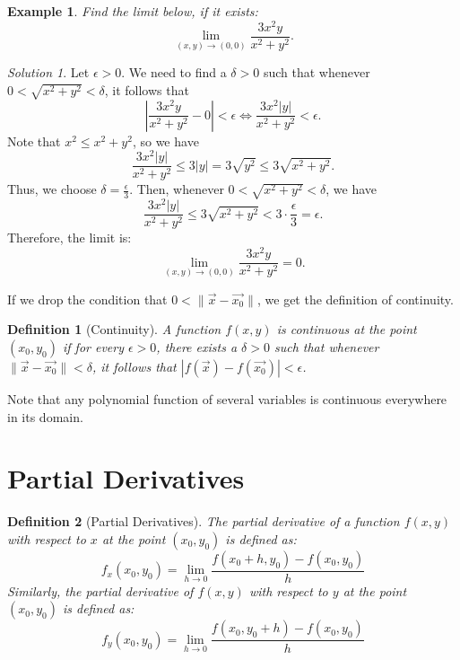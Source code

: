 \documentclass{book}
\newtheorem{example}{Example}[chapter]
\newtheorem{definition}{Definition}[chapter]
\theoremstyle{remark}
\newtheorem*{solution}{Solution}
\begin{document}
\begin{example}
    Find the limit below, if it exists:
    \[
        \lim_{(x, y) \to (0, 0)} \frac{3x^2 y}{x^2 + y^2}.
    \]
\end{example}
\begin{solution}
    Let $\epsilon > 0$. We need to find a $\delta > 0$ such that whenever $0 < \sqrt{x^2 + y^2} < \delta$, it follows that
    \[
        \left| \frac{3x^2 y}{x^2 + y^2} - 0 \right| < \epsilon \Leftrightarrow \frac{3x^2 |y|}{x^2 + y^2} < \epsilon.
    \]
    Note that $x^2 \leq x^2 + y^2$, so we have
    \[
        \frac{3x^2 |y|}{x^2 + y^2} \leq 3|y| = 3\sqrt{y^2} \leq 3\sqrt{x^2 + y^2}.
    \]
    Thus, we choose $\delta = \frac{\epsilon}{3}$. Then, whenever $0 < \sqrt{x^2 + y^2} < \delta$, we have
    \[
        \frac{3x^2 |y|}{x^2 + y^2} \leq 3\sqrt{x^2 + y^2} < 3 \cdot \frac{\epsilon}{3} = \epsilon.
    \]
    Therefore, the limit is:
    \[
        \lim_{(x, y) \to (0, 0)} \frac{3x^2 y}{x^2 + y^2} = 0.
    \]
\end{solution}

If we drop the condition that $0 < \| \vec{x} - \vec{x_0} \|$, we get the definition of continuity.

\begin{definition}[Continuity]
    A function $f(x, y)$ is continuous at the point $(x_0, y_0)$ if for every $\epsilon > 0$, there exists a $\delta > 0$ such that whenever $\| \vec{x} - \vec{x_0} \| < \delta$, it follows that $|f(\vec{x}) - f(\vec{x_0})| < \epsilon$.
\end{definition}

Note that any polynomial function of several variables is continuous everywhere in its domain.

\section{Partial Derivatives}

\begin{definition}[Partial Derivatives]
    The partial derivative of a function $f(x, y)$ with respect to $x$ at the point $(x_0, y_0)$ is defined as:
    \[
        f_x(x_0, y_0) = \lim_{h \to 0} \frac{f(x_0 + h, y_0) - f(x_0, y_0)}{h}
    \]
    Similarly, the partial derivative of $f(x, y)$ with respect to $y$ at the point $(x_0, y_0)$ is defined as:
    \[
        f_y(x_0, y_0) = \lim_{h \to 0} \frac{f(x_0, y_0 + h) - f(x_0, y_0)}{h}
    \]
\end{definition}
\end{document}
